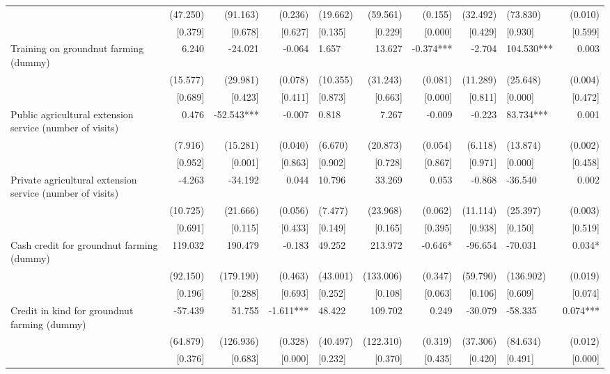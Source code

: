 \documentclass[
]{article}
\begin{document}
\begin{landscape}
\begin{ThreePartTable}
\begin{longtable}[t]{lrrrlrrrlr}
 & (47.250) & (91.163) & (0.236) & (19.662) & (59.561) & (0.155) & (32.492) & (73.830) & (0.010)\\
 & {}[0.379] & {}[0.678] & {}[0.627] & {}[0.135] & {}[0.229] & {}[0.000] & {}[0.429] & {}[0.930] & {}[0.599]\\
Training on groundnut farming (dummy) & 6.240 & -24.021 & -0.064 & 1.657 & 13.627 & -0.374*** & -2.704 & 104.530*** & 0.003\\
 & (15.577) & (29.981) & (0.078) & (10.355) & (31.243) & (0.081) & (11.289) & (25.648) & (0.004)\\
 & {}[0.689] & {}[0.423] & {}[0.411] & {}[0.873] & {}[0.663] & {}[0.000] & {}[0.811] & {}[0.000] & {}[0.472]\\
Public agricultural extension service (number of visits) & 0.476 & -52.543*** & -0.007 & 0.818 & 7.267 & -0.009 & -0.223 & 83.734*** & 0.001\\
 & (7.916) & (15.281) & (0.040) & (6.670) & (20.873) & (0.054) & (6.118) & (13.874) & (0.002)\\
 & {}[0.952] & {}[0.001] & {}[0.863] & {}[0.902] & {}[0.728] & {}[0.867] & {}[0.971] & {}[0.000] & {}[0.458]\\
Private agricultural extension service (number of visits) & -4.263 & -34.192 & 0.044 & 10.796 & 33.269 & 0.053 & -0.868 & -36.540 & 0.002\\
 & (10.725) & (21.666) & (0.056) & (7.477) & (23.968) & (0.062) & (11.114) & (25.397) & (0.003)\\
 & {}[0.691] & {}[0.115] & {}[0.433] & {}[0.149] & {}[0.165] & {}[0.395] & {}[0.938] & {}[0.150] & {}[0.519]\\
Cash credit for groundnut farming (dummy) & 119.032 & 190.479 & -0.183 & 49.252 & 213.972 & -0.646* & -96.654 & -70.031 & 0.034*\\
 & (92.150) & (179.190) & (0.463) & (43.001) & (133.006) & (0.347) & (59.790) & (136.902) & (0.019)\\
 & {}[0.196] & {}[0.288] & {}[0.693] & {}[0.252] & {}[0.108] & {}[0.063] & {}[0.106] & {}[0.609] & {}[0.074]\\
Credit in kind for groundnut farming (dummy) & -57.439 & 51.755 & -1.611*** & 48.422 & 109.702 & 0.249 & -30.079 & -58.335 & 0.074***\\
 & (64.879) & (126.936) & (0.328) & (40.497) & (122.310) & (0.319) & (37.306) & (84.634) & (0.012)\\
 & {}[0.376] & {}[0.683] & {}[0.000] & {}[0.232] & {}[0.370] & {}[0.435] & {}[0.420] & {}[0.491] & {}[0.000]\\

\end{longtable}
\end{ThreePartTable}
\end{landscape}
\end{document}
